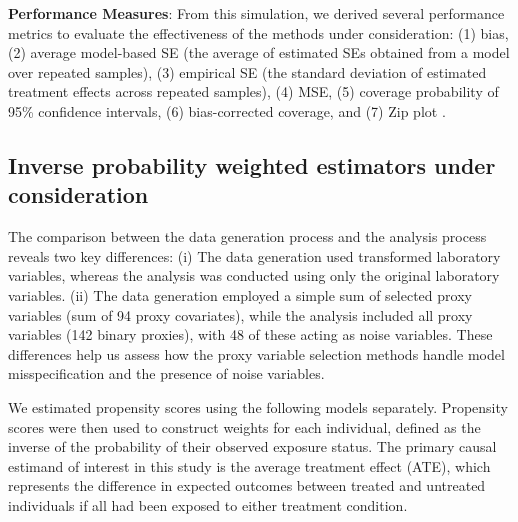 \documentclass[sn-vancouver,Numbered,lineno,pdflatex]{sn-jnl}
\begin{document}
\textbf{Performance Measures}: From this simulation, we derived several
performance metrics to evaluate the effectiveness of the methods under
consideration: (1) bias, (2) average model-based SE (the average of
estimated SEs obtained from a model over repeated samples), (3)
empirical SE (the standard deviation of estimated treatment effects
across repeated samples), (4) MSE, (5) coverage probability of 95\%
confidence intervals, (6) bias-corrected coverage, and (7) Zip plot
\citep{morris2019using, white2023check}.

\subsection*{Inverse probability weighted estimators under
consideration}\label{inverse-probability-weighted-estimators-under-consideration}

The comparison between the data generation process and the analysis
process reveals two key differences: (i) The data generation used
transformed laboratory variables, whereas the analysis was conducted
using only the original laboratory variables. (ii) The data generation
employed a simple sum of selected proxy variables (sum of 94 proxy
covariates), while the analysis included all proxy variables (142 binary
proxies), with 48 of these acting as noise variables. These differences
help us assess how the proxy variable selection methods handle model
misspecification and the presence of noise variables.

We estimated propensity scores using the following models separately.
Propensity scores were then used to construct weights for each
individual, defined as the inverse of the probability of their observed
exposure status. The primary causal estimand of interest in this study
is the average treatment effect (ATE), which represents the difference
in expected outcomes between treated and untreated individuals if all
had been exposed to either treatment condition.
\end{document}
